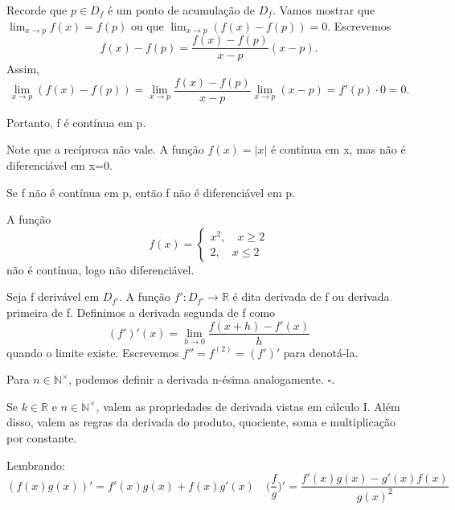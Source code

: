 \documentclass[Analysis/analysis_notes.tex]{subfiles}
\begin{document}
\begin{proof*}
	Recorde que \(p\in D_{f}\) é um ponto de acumula\c cão de \(D_{f}\).
	Vamos mostrar que \(\lim_{x\to p}f(x)=f(p)\) ou que \(\lim_{x\to p}(f(x)-f(p))=0.\)
	Escrevemos
	\[
		f(x)-f(p) = \frac{f(x)-f(p)}{x-p}(x-p).
	\]
	Assim,
	\[
		\lim_{x\to p}(f(x)-f(p)) = \lim_{x\to p}\frac{f(x)-f(p)}{x-p}\lim_{x\to p}(x-p) = f'(p)\cdot 0 = 0.
	\]

	Portanto, f é contínua em p.
\end{proof*}
Note que a recíproca não vale. A fun\c cão \(f(x) = |x|\) é contínua em x, mas
não é diferenciável em x=0.
\hypertarget{negative_diff}{   \begin{example}
		Se f não é contínua em p, então f não é diferenciável em p.
	\end{example}}
\begin{example}
	A fun\c cão
	\[
		f(x) = \left\{\begin{array}{ll}
			x^2,\quad x\geq 2 \\
			2,\quad x\leq 2
		\end{array}\right.
	\]
	não é contínua, logo não diferenciável.
\end{example}
\begin{def*}
	Seja f derivável em \(D_{f'}\). A fun\c cão \(f':D_{f'}\rightarrow \mathbb{R}\)
	é dita derivada de f ou derivada primeira de f. Definimos a derivada segunda de f
	como
	\[
		(f')'(x) = \lim_{h\to 0}\frac{f(x+h)-f'(x)}{h}
	\]
	quando o limite existe. Escrevemos \(f''=f^{(2)} = (f')'\) para denotá-la.

	Para \(n \in\mathbb{N}^{\times}\), podemos definir a derivada n-ésima analogamente. \(\square\).
\end{def*}
\begin{theorem*}
	Se \(k\in \mathbb{R}\) e \(n\in \mathbb{N}^{\times}\), valem as propriedades
	de derivada vistas em cálculo I. Além disso, valem as regras
	da derivada do produto, quociente, soma e multiplica\c cão por constante.
\end{theorem*}
Lembrando:
\[
	(f(x)g(x))' = f'(x)g(x) + f(x)g'(x)\quad \biggl(\frac{f}{g}\biggr)' = \frac{f'(x)g(x) - g'(x)f(x)}{g(x)^2}
\]
\end{document}
